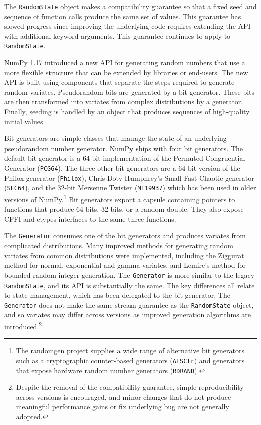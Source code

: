 \documentclass[fleqn,10pt]{wlscirep}
\newcommand{\code}[1]{\texttt{#1}}
\begin{document}
The \code{RandomState} object makes a compatibility guarantee so that a fixed
seed and sequence of function calls produce the same set of values. This
guarantee has slowed progress since improving the underlying code requires
extending the API with additional keyword arguments. This guarantee continues to
apply to \code{RandomState}. 


NumPy 1.17 introduced a new API for generating random numbers that use a more
flexible structure that can be extended by libraries or end-users. The new API
is built using components that separate the steps required to generate random
variates. Pseudorandom bits are generated by a bit generator. These bits are
then transformed into variates from complex distributions by a generator.
Finally, seeding is handled by an object that produces sequences of high-quality
initial values.

Bit generators are simple classes that manage the state of an underlying
pseudorandom number generator. NumPy ships with four bit generators. The default
bit generator is a 64-bit implementation of the Permuted Congruential Generator
\cite{pcg64} (\code{PCG64}). The three other bit generators are a 64-bit version
of the Philox generator\cite{random123} (\code{Philox}), Chris Doty-Humphrey's
Small Fast Chaotic generator\cite{practrand} (\code{SFC64}), and the 32-bit
Mersenne Twister\cite{mt19937} (\code{MT19937}) which has been used in older
versions of NumPy.\footnote{The
\href{https://github.com/bashtage/randomgen}{randomgen project} supplies a wide
range of alternative bit generators such as a cryptographic counter-based
generators (\code{AESCtr}) and generators that expose hardware random number
generators (\code{RDRAND})\cite{randomgen}.} Bit generators export a capsule
containing pointers to functions that produce 64 bits, 32 bits, or a random
double. They also expose CFFI and ctypes interfaces to the same three functions.

The \code{Generator} consumes one of the bit generators and produces variates
from complicated distributions. Many improved methods for generating random
variates from common distributions were implemented, including the Ziggurat
method for normal, exponential and gamma variates\cite{ziggurat}, and Lemire's
method for bounded random integer generation\cite{lemire}. The \code{Generator}
is more similar to the legacy \code{RandomState}, and its API is substantially
the same. The key differences all relate to state management, which has been
delegated to the bit generator. The \code{Generator} does not make the same
stream guarantee as the \code{RandomState} object, and so variates may differ
across versions as improved generation algorithms are
introduced.\footnote{Despite the removal of the compatibility guarantee, simple
reproducibility across versions is encouraged, and minor changes that do not
produce meaningful performance gains or fix underlying bug are not generally
adopted.}
\end{document}
